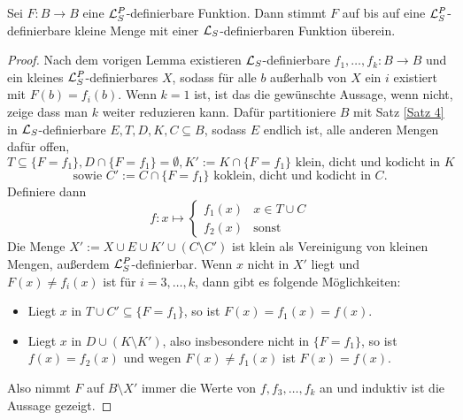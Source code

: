 \begin{theorem}\label{Satz 3}
	Sei $F:B\rightarrow B$ eine $\mathcal{L}^P_S$-definierbare Funktion. Dann stimmt $F$ auf bis auf eine $\mathcal{L}^P_S$-definierbare kleine Menge mit einer $\mathcal{L}_S$-definierbaren Funktion überein.
\end{theorem}
\begin{proof}
	Nach dem vorigen Lemma existieren $\mathcal{L}_S$-definierbare $f_1,\dots,f_k:B\rightarrow B$ und ein kleines $\mathcal{L}^P_S$-definierbares $X$, sodass für alle $b$ außerhalb von $X$ ein $i$ existiert mit $F(b)=f_i(b)$. Wenn $k=1$ ist, ist das die gewünschte Aussage, wenn nicht, zeige dass man $k$ weiter reduzieren kann. Dafür partitioniere $B$ mit Satz \ref{Satz 4} in $\mathcal{L}_S$-definierbare ${E,T,D,K,C\subseteq B}$, sodass $E$ endlich ist, alle anderen Mengen dafür offen, 
	$$T\subseteq\{F=f_1\}, D\cap\{F=f_1\}=\emptyset,K':=K\cap\{F=f_1\}\text{ klein, dicht und kodicht in }K$$ $$\text{sowie }C':=C\cap\{F=f_1\}\text{ koklein, dicht und kodicht in }C.$$
	Definiere dann $$f:x\mapsto\left\{\begin{array}{ll}
	f_1(x)&x\in T\cup C\\
	f_2(x)&\text{sonst}
	\end{array}\right.$$\newpage
	Die Menge $X':=X\cup E\cup K'\cup (C\setminus C')$ ist klein als Vereinigung von kleinen Mengen, außerdem $\mathcal{L}^P_S$-definierbar. Wenn $x$ nicht in $X'$ liegt und $F(x)\neq f_i(x)$ ist für $i=3,\dots,k$, dann gibt es folgende Möglichkeiten:
	\begin{itemize}
		\item Liegt $x$ in $T\cup C'\subseteq\{F=f_1\}$, so ist $F(x)=f_1(x)=f(x)$.
		\item Liegt $x$ in $D\cup(K\setminus K')$, also insbesondere nicht in $\{F=f_1\}$, so ist $f(x)=f_2(x)$ und wegen $F(x)\neq f_1(x)$ ist $F(x)=f(x)$.
	\end{itemize}
    Also nimmt $F$ auf $B\setminus X'$ immer die Werte von $f,f_3,\dots,f_k$ an und induktiv ist die Aussage gezeigt.
\end{proof}

